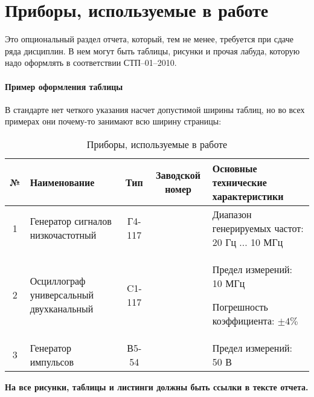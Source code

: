 \section{Приборы, используемые в работе}

Это опциональный раздел отчета, который, тем не менее, требуется при сдаче ряда дисциплин.
В нем могут быть таблицы, рисунки и прочая лабуда, которую надо оформлять в соответствии СТП–01–2010.

\paragraph{Пример оформления таблицы} В стандарте нет четкого указания насчет допустимой ширины таблиц, но во всех примерах они почему-то 
занимают всю ширину страницы:

\begin{table}[h!]
  \caption{Приборы, используемые в работе}
  \renewcommand{\tabcolsep}{0.7em}
  \begin{tabularx}{\textwidth}{| c | X | c | c | X |} %
  \hline
   № &  Наименование & Тип & Заводской номер & Основные технические характеристики \\ \hline

   1 & Генератор сигналов низкочастотный & Г4-117 & &
   Диапазон генерируемых частот: 20 Гц $ ... $ 10 МГц \\ \hline

   2 & Осциллограф универсальный двухканальный & C1-117 & &
   Предел измерений: 10 МГц \par
   Погрешность коэффициента: $ \pm4 \% $ \\ \hline

   3 & Генератор импульсов & В5-54 & &
   Предел измерений: 50 В \\ \hline  
  \end{tabularx}
\end{table}

\textbf{На все рисунки, таблицы и листинги должны быть ссылки в тексте отчета.}

\newpage